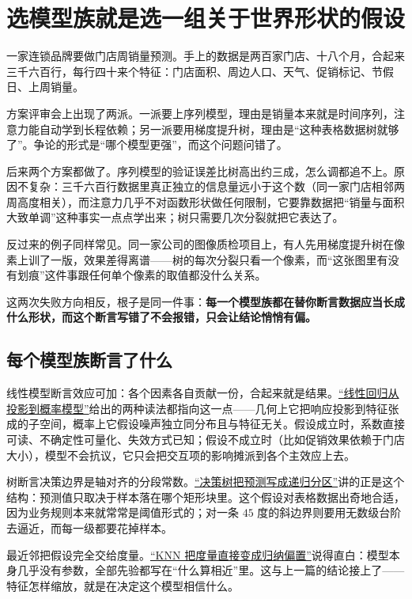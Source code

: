 \section{选模型族就是选一组关于世界形状的假设}
\label{sec:17-Synthesis/01-System-Lifecycle/03}

一家连锁品牌要做门店周销量预测。手上的数据是两百家门店、十八个月，合起来三千六百行，每行四十来个特征：门店面积、周边人口、天气、促销标记、节假日、上周销量。

方案评审会上出现了两派。一派要上序列模型，理由是销量本来就是时间序列，注意力能自动学到长程依赖；另一派要用梯度提升树，理由是``这种表格数据树就够了''。争论的形式是``哪个模型更强''，而这个问题问错了。

后来两个方案都做了。序列模型的验证误差比树高出约三成，怎么调都追不上。原因不复杂：三千六百行数据里真正独立的信息量远小于这个数（同一家门店相邻两周高度相关），而注意力几乎不对函数形状做任何限制，它要靠数据把``销量与面积大致单调''这种事实一点点学出来；树只需要几次分裂就把它表达了。

反过来的例子同样常见。同一家公司的图像质检项目上，有人先用梯度提升树在像素上训了一版，效果差得离谱——树的每次分裂只看一个像素，而``这张图里有没有划痕''这件事跟任何单个像素的取值都没什么关系。

这两次失败方向相反，根子是同一件事：\textbf{每一个模型族都在替你断言数据应当长成什么形状，而这个断言写错了不会报错，只会让结论悄悄有偏。}

\subsection{每个模型族断言了什么}

线性模型断言效应可加：各个因素各自贡献一份，合起来就是结果。\hyperref[sec:13-Machine-Learning/02-Linear-Models/01]{``线性回归从投影到概率模型''}给出的两种读法都指向这一点——几何上它把响应投影到特征张成的子空间，概率上它假设噪声独立同分布且与特征无关。假设成立时，系数直接可读、不确定性可量化、失效方式已知；假设不成立时（比如促销效果依赖于门店大小），模型不会抗议，它只会把交互项的影响摊派到各个主效应上去。

树断言决策边界是轴对齐的分段常数。\hyperref[sec:13-Machine-Learning/03-Trees-Ensembles-and-Neighbors/01]{``决策树把预测写成递归分区''}讲的正是这个结构：预测值只取决于样本落在哪个矩形块里。这个假设对表格数据出奇地合适，因为业务规则本来就常常是阈值形式的；对一条 \(45\) 度的斜边界则要用无数级台阶去逼近，而每一级都要花掉样本。

最近邻把假设完全交给度量。\hyperref[sec:13-Machine-Learning/03-Trees-Ensembles-and-Neighbors/03]{``KNN 把度量直接变成归纳偏置''}说得直白：模型本身几乎没有参数，全部先验都写在``什么算相近''里。这与上一篇的结论接上了——特征怎样缩放，就是在决定这个模型相信什么。

